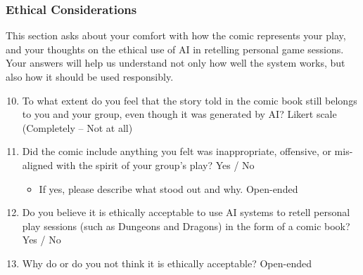 \subsubsection*{Ethical Considerations}
This section asks about your comfort with how the comic represents your play, and your thoughts on the ethical use of AI in retelling personal game sessions. Your answers will help us understand not only how well the system works, but also how it should be used responsibly.
\begin{enumerate}
    \setcounter{enumi}{9}
    \item To what extent do you feel that the story told in the comic book still belongs to you and your group, even though it was generated by AI? \hfill Likert scale (Completely -- Not at all)
    \item Did the comic include anything you felt was inappropriate, offensive, or mis- aligned with the spirit of your group's play? \hfill Yes / No
    \begin{itemize}
        \item If yes, please describe what stood out and why. \hfill Open-ended
    \end{itemize}
    \item Do you believe it is ethically acceptable to use AI systems to retell personal play sessions (such as Dungeons and Dragons) in the form of a comic book? \hfill Yes / No
    \item Why do or do you not think it is ethically acceptable? \hfill Open-ended
\end{enumerate}

